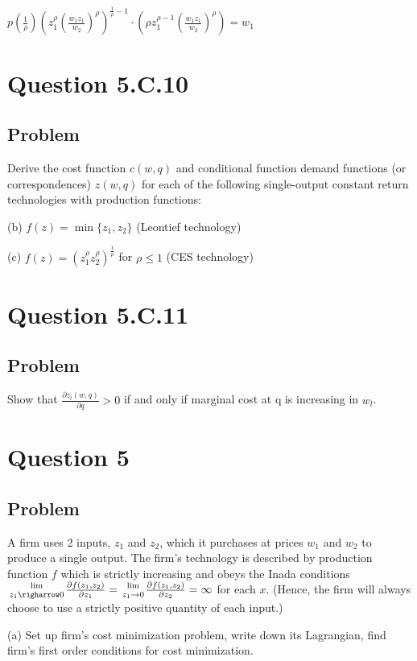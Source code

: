 \documentclass[10pt, a4paper]{article}
\begin{document}
      \begin{center}
        $p(\frac{1}{\rho})(z_1^{\rho}(\frac{w_1z_1}{w_2})^{\rho})^{\frac{1}{\rho}-1}\cdot(\rho z_1^{\rho-1}(\frac{w_1z_1}{w_2})^{\rho})=w_1$ \\
        

  \section{Question 5.C.10}
    \subsection{Problem}
      
      Derive the cost function $c(w,q)$ and conditional function demand functions (or correspondences) $z(w,q)$ for each of the following single-output constant return technologies with production functions:

      (b) $f(z)=\min\{z_1,z_2\}$ (Leontief technology)

      (c) $f(z)=(z_1^{\rho}z_2^{\rho})^{\frac{1}{\rho}}$ for $\rho\leq1$ (CES technology) 
  \section{Question 5.C.11}
    \subsection{Problem}
      Show that $\frac{\partial z_l(w,q)}{\partial q}>0$ if and only if marginal cost at q is increasing in $w_l$.
  \section{Question 5}
    \subsection{Problem}
      A firm uses 2 inputs, $z_1$ and $z_2$, which it purchases at prices $w_1$ and $w_2$ to produce a single output. The firm's technology is described by production function $f$ which is strictly increasing and obeys the Inada conditions ${\lim\atop{z_1\righarrow0}}\frac{\partial f(z_1,z_2)}{\partial z_1}={\lim\atop{z_1\rightarrow0}}\frac{\partial f(z_1, z_2)}{\partial z_2}=\infty$ for each $x$. (Hence, the firm will always choose to use a strictly positive quantity of each input.)

      (a) Set up firm's cost minimization problem, write down its Lagrangian, find firm's first order conditions for cost minimization.


\end{center}
\end{document}
